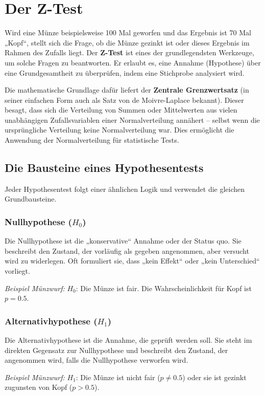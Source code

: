 \chapter{Der Z-Test}

Wird eine Münze beispielsweise 100 Mal geworfen und das Ergebnis ist 70 Mal „Kopf“, stellt sich die Frage, ob die Münze gezinkt ist oder dieses Ergebnis im Rahmen des Zufalls liegt. Der \textbf{Z-Test} ist eines der grundlegendsten Werkzeuge, um solche Fragen zu beantworten. Er erlaubt es, eine Annahme (Hypothese) über eine Grundgesamtheit zu überprüfen, indem eine Stichprobe analysiert wird.

Die mathematische Grundlage dafür liefert der \textbf{Zentrale Grenzwertsatz} (in seiner einfachen Form auch als Satz von de Moivre-Laplace bekannt). Dieser besagt, dass sich die Verteilung von Summen oder Mittelwerten aus vielen unabhängigen Zufallsvariablen einer Normalverteilung annähert – selbst wenn die ursprüngliche Verteilung keine Normalverteilung war. Dies ermöglicht die Anwendung der Normalverteilung für statistische Tests.

\section{Die Bausteine eines Hypothesentests}

Jeder Hypothesentest folgt einer ähnlichen Logik und verwendet die gleichen Grundbausteine.

\subsection{Nullhypothese ($H_0$)}
Die Nullhypothese ist die „konservative“ Annahme oder der Status quo. Sie beschreibt den Zustand, der vorläufig als gegeben angenommen, aber versucht wird zu widerlegen. Oft formuliert sie, dass „kein Effekt“ oder „kein Unterschied“ vorliegt.

\textit{Beispiel Münzwurf:} $H_0$: Die Münze ist fair. Die Wahrscheinlichkeit für Kopf ist $p = 0.5$.

\subsection{Alternativhypothese ($H_1$)}
Die Alternativhypothese ist die Annahme, die geprüft werden soll. Sie steht im direkten Gegensatz zur Nullhypothese und beschreibt den Zustand, der angenommen wird, falls die Nullhypothese verworfen wird.

\textit{Beispiel Münzwurf:} $H_1$: Die Münze ist nicht fair ($p \neq 0.5$) oder sie ist gezinkt zugunsten von Kopf ($p > 0.5$).

